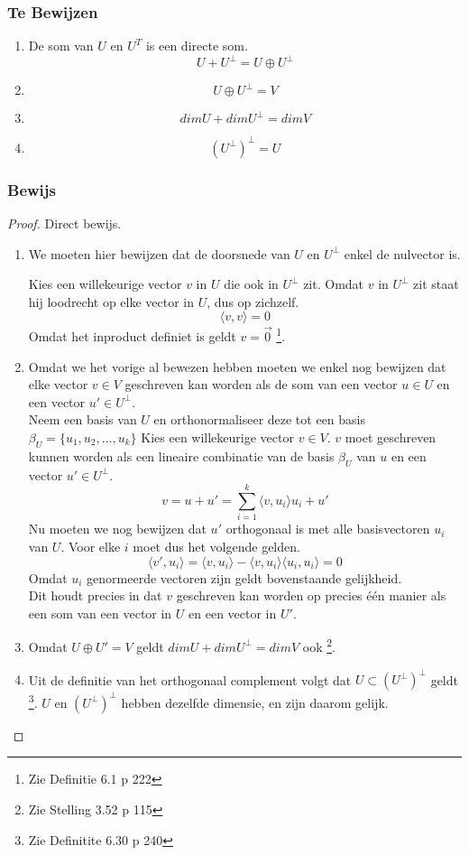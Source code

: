 \documentclass[lineaire_algebra_oplossingen.tex]{subfiles}
\begin{document}
\subsubsection*{Te Bewijzen}
\begin{enumerate}
\item De som van $U$ en $U^T$ is een directe som.
\[U + U^\bot = U \oplus U^\bot\]
\item
\[U\oplus U^\bot = V\]
\item
\[dimU + dimU^\bot = dim V\]
\item
\[(U^\bot)^\bot = U\]
\end{enumerate}

\subsubsection*{Bewijs}
\begin{proof}
Direct bewijs.
\begin{enumerate}
\item
We moeten hier bewijzen dat de doorsnede van $U$ en $U^\bot$ enkel de nulvector is.

Kies een willekeurige vector $v$ in $U$ die ook in $U^\bot$ zit. Omdat $v$ in $U^\bot$ zit staat hij loodrecht op elke vector in $U$, dus op zichzelf.
\[
\langle v,v \rangle = 0
\]
Omdat het inproduct definiet is geldt $v=\vec{0}$ \footnote{Zie Definitie 6.1 p 222}.

\item
Omdat we het vorige al bewezen hebben moeten we enkel nog bewijzen dat elke vector $v\in V$ geschreven kan worden als de som van een vector $u \in U$ en een vector $u'\in U^\bot$.\\
Neem een basis van $U$ en orthonormaliseer deze tot een basis $\beta_U = \{u_1,u_2,...,u_k\}$
Kies een willekeurige vector $v\in V$. $v$ moet geschreven kunnen worden als een lineaire combinatie van de basis $\beta_U$ van $u$ en een vector $u' \in U^\bot$.
\[
v = u + u' = \sum_{i=1}^k\langle v,u_i\rangle u_i + u'
\]
Nu moeten we nog bewijzen dat $u'$ orthogonaal is met alle basisvectoren $u_i$ van $U$. Voor elke $i$ moet dus het volgende gelden.
\[
\langle v',u_i \rangle = \langle v,u_i\rangle - \langle v,u_i\rangle\langle u_i,u_i\rangle = 0
\]
Omdat $u_i$ genormeerde vectoren zijn geldt bovenstaande gelijkheid.\\
Dit houdt precies in dat $v$ geschreven kan worden op precies \'e\'en manier als een som van een vector in $U$ en een vector in $U'$.

\item
Omdat $U \oplus U' = V$ geldt $dimU+dimU^\bot = dimV$ ook \footnote{Zie Stelling 3.52 p 115}.

\item
Uit de definitie van het orthogonaal complement volgt dat $U \subset (U^\bot)^\bot$ geldt \footnote{Zie Definitite 6.30 p 240}. $U$ en $(U^\bot)^\bot$ hebben dezelfde dimensie, en zijn daarom gelijk. 
\end{enumerate}
\end{proof}
\end{document}
